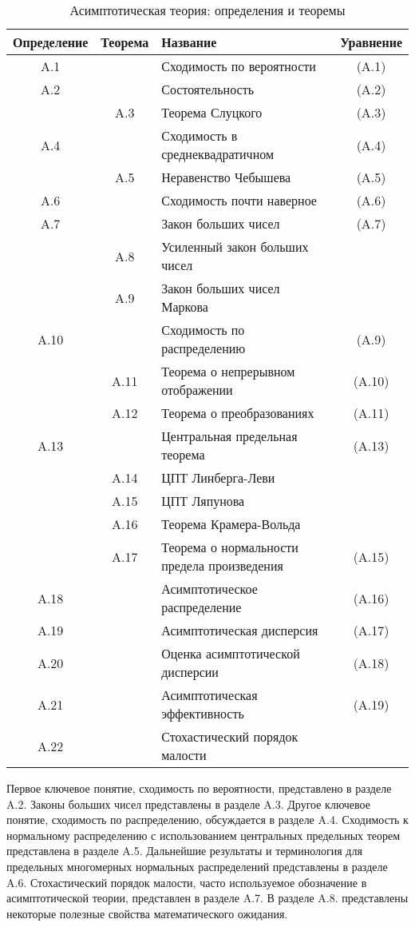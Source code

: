 \begin{table}[h]
\caption{\label{tab:asydef} Асимптотическая теория: определения и теоремы}
\begin{tabular}{cclc}
\hline 
\hline
Определение & Теорема & Название & Уравнение \\ 
\hline 
A.1 &  & Сходимость по вероятности & (A.1) \\ 
A.2 &   & Состоятельность & (A.2) \\ 
 & A.3 & Теорема Слуцкого & (A.3) \\ 
A.4 &  & Сходимость в среднеквадратичном & (A.4) \\ 
 & A.5 & Неравенство Чебышева & (A.5) \\ 
A.6 &  & Сходимость почти наверное & (A.6) \\ 
A.7 &  & Закон больших чисел & (A.7) \\ 
 & A.8 & Усиленный закон больших чисел &  \\ 
 & A.9 & Закон больших чисел Маркова &  \\ 
A.10 &  & Сходимость по распределению & (A.9) \\ 
 & A.11 & Теорема о непрерывном отображении & (A.10) \\ 
  & A.12 & Теорема о преобразованиях &  (A.11) \\ 
A.13 &  & Центральная предельная теорема & (A.13)  \\ 
 & A.14 & ЦПТ Линберга-Леви & \\
 & A.15 & ЦПТ Ляпунова & \\
 & A.16 & Теорема Крамера-Вольда & \\
 & A.17 & Теорема о нормальности предела произведения & (A.15) \\
A.18 & & Асимптотическое распределение & (A.16) \\
A.19 & & Асимптотическая дисперсия & (A.17) \\
A.20 & & Оценка асимптотической дисперсии & (A.18) \\
A.21 & & Асимптотическая эффективность & (A.19) \\
A.22 & & Стохастический порядок малости & \\
\hline
\hline
\end{tabular} 
\end{table}

Первое ключевое понятие, сходимость по вероятности, представлено в разделе A.2. Законы больших чисел представлены в разделе A.3. Другое ключевое понятие, сходимость по распределению, обсуждается в разделе A.4. Сходимость к нормальному распределению с использованием центральных предельных теорем представлена в разделе A.5. Дальнейшие результаты и терминология для предельных многомерных нормальных распределений представлены в разделе A.6. Стохастический порядок малости, часто используемое обозначение в асимптотической теории, представлен в разделе A.7. В разделе A.8. представлены некоторые полезные свойства математического ожидания.


